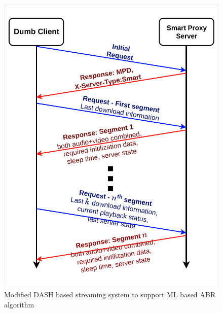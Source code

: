 \begin{figure}[h]
	\begin{center}
		\includegraphics[width=0.5\linewidth]{img/splitDASHTransaction}
	\end{center}
	\caption{\label{fig:splitDASHTransaction} Modified DASH based streaming system to support ML based ABR algorithm}
\end{figure}

